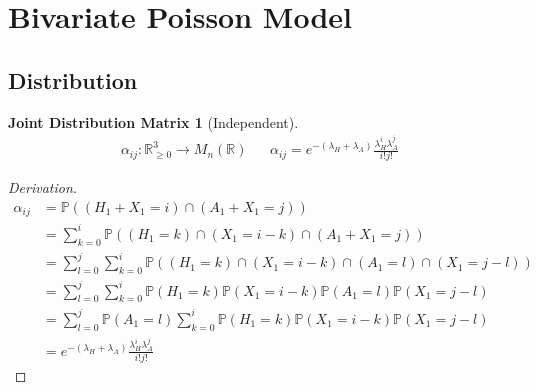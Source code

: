 \documentclass[a4paper,11pt,oneside]{book}
\theoremstyle{plain}
\newtheorem*{jdm}{Joint Distribution Matrix}
\theoremstyle{definition}
\begin{document}
\section{Bivariate Poisson Model}
\subsection{Distribution}
\begin{jdm}[Independent]
\begin{align*}
\alpha_{ij}: \mathbb{R}^3_{\ge 0} \rightarrow M_n(\mathbb{R}) && \alpha_{ij}=e^{-(\lambda_H+\lambda_A)}\frac{\lambda_H^i\lambda_A^j}{i!j!}
\end{align*}
\end{jdm}
\begin{proof}[Derivation]
\begin{align*}
\alpha_{ij}&=\mathbb{P}((H_1+X_1=i)\cap (A_1+X_1=j))\\
&=\sum_{k=0}^i \mathbb{P}((H_1=k)\cap (X_1=i-k)\cap (A_1+X_1=j))\\
&=\sum_{l=0}^j\sum_{k=0}^i \mathbb{P}((H_1=k)\cap (X_1=i-k)\cap (A_1=l)\cap (X_1=j-l))\\
&=\sum_{l=0}^j\sum_{k=0}^i \mathbb{P}(H_1=k)\mathbb{P}(X_1=i-k)\mathbb{P} (A_1=l)\mathbb{P} (X_1=j-l)\\
&=\sum_{l=0}^j\mathbb{P} (A_1=l)\sum_{k=0}^i \mathbb{P}(H_1=k)\mathbb{P}(X_1=i-k)\mathbb{P} (X_1=j-l)\\
&=e^{-(\lambda_H+\lambda_A)}\frac{\lambda_H^i\lambda_A^j}{i!j!}
\end{align*}
\end{proof}
\end{document}
